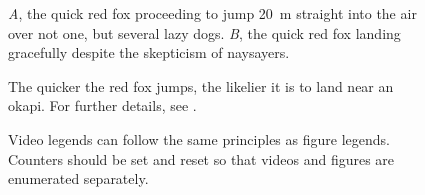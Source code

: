 \documentclass[11pt]{article}
\begin{document}
\begin{figure}[h!]
\caption{\textit{A}, the quick red fox proceeding to jump 20~m straight into the air over not one, but several lazy dogs. \textit{B}, the quick red fox landing gracefully despite the skepticism of naysayers.}
\label{Fig:Jumps}
\end{figure}

\begin{figure}[h!]
\caption{The quicker the red fox jumps, the likelier it is to land near an okapi. For further details, see \citet{LemKapEx07}.}
\label{Fig:JumpsOk}
\end{figure}




\renewcommand{\figurename}{Video} 
\renewcommand{\thefigure}{S\arabic{figure}}
\setcounter{figure}{0}

\begin{figure}[h!]
\caption{Video legends can follow the same principles as figure legends. Counters should be set and reset so that videos and figures are enumerated separately.}
\label{VideoExample}
\end{figure}

\renewcommand{\figurename}{Figure}
\setcounter{figure}{1}

\end{document}

